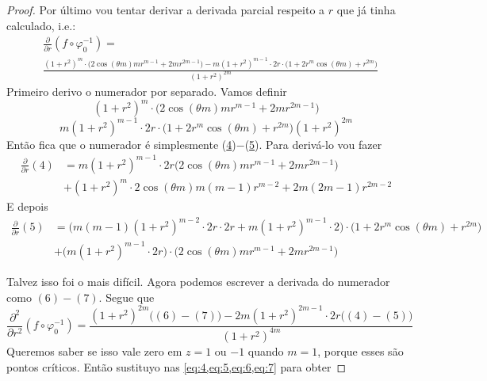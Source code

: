 \begin{proof}
Por último vou tentar derivar a derivada parcial respeito a \(r\) que já tinha calculado, i.e.:
\begin{equation}\label{eq:3}\begin{aligned}&\frac{\partial }{\partial r}(f \circ \varphi_0^{-1})=\\&\frac{(1+r^2)^m\cdot \Big(2\cos (\theta m)m r^{m-1}+2mr^{2m-1}\Big)-m(1+r^2)^{m-1}\cdot 2r\cdot \Big(1+2r^m \cos (\theta m)+r^{2m}\Big)}{(1+r^2)^{2m}}
\end{aligned}\end{equation}
Primeiro derivo o numerador por separado. Vamos definir
\begin{equation}\label{eq:4}
(1+r^2)^m\cdot \Big(2\cos (\theta m)m r^{m-1}+2mr^{2m-1}\Big)
\end{equation}
\begin{equation}\label{eq:5}
m(1+r^2)^{m-1}\cdot 2r\cdot \Big(1+2r^m \cos (\theta m)+r^{2m}\Big)(1+r^2)^{2m} 
\end{equation}
Então fica que o numerador é simplesmente (\hyperref[eq:4]{4})\(-\)(\hyperref[eq:5]{5}). Para derivá-lo vou fazer
\begin{equation}\label{eq:6}\begin{aligned}\frac{\partial }{\partial r}(\hyperref[eq:4]{4})&=m(1+r^2)^{m-1}\cdot 2r\Big(2\cos (\theta m)m r^{m-1}+2mr^{2m-1}\Big)\\
	& +(1+r^2)^m\cdot 2\cos(\theta m)m(m-1)r^{m-2}+2m(2m-1)r^{2m-2}
\end{aligned}\end{equation}
E depois
\begin{equation}\label{eq:7}
\begin{aligned}
\frac{\partial }{\partial r}(\hyperref[eq:5]{5})
&=\Big(m(m-1)(1+r^2)^{m-2}\cdot 2r\cdot 2r+m(1+r^2)^{m-1}\cdot 2 \Big)\cdot \Big(1+2r^m \cos (\theta m)+r^{2m}\Big)\\
&+\Big(m(1+r^2)^{m-1}\cdot 2r \Big)\cdot \Big(2\cos(\theta m)mr^{m-1}+2mr^{2m-1}\Big)
\end{aligned}\end{equation}

Talvez isso foi o mais difícil. Agora podemos escrever a derivada do numerador como \((\hyperref[eq:6]{6})-(\hyperref[eq:7]{7})\). Segue que
\begin{equation}\label{eq:8}
\frac{\partial^2 }{\partial r^2}(f \circ \varphi_0^{-1})=\frac{(1+r^2)^{2m}\Big((\hyperref[eq:6]{6})-(\hyperref[eq:7]{7})\Big)-2m(1+r^2)^{2m-1}\cdot 2r\Big((\hyperref[eq:4]{4})-(\hyperref[eq:5]{5})\Big)}{(1+r^2)^{4m}}
\end{equation}
Queremos saber se isso vale zero em \(z=1\) ou \(-1\) quando  \(m=1\), porque esses são pontos críticos. Então sustituyo nas  \cref{eq:4,eq:5,eq:6,eq:7} para obter
\end{proof}

